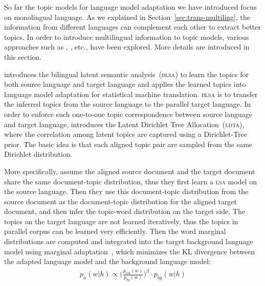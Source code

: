 So far the topic models for language model adaptation we have introduced focus on monolingual language. As we explained in Section~\ref{sec:trans-multiling}, the information from different languages can complement each other to extract better topics. In order to introduce multilingual information to topic models, various approaches such as \cite{Tam-2007}, \cite{Ruiz-2011}, \cite{Yu-2013} etc., have been explored. More details are introduced in this section.

\cite{Tam-2007} introduces the bilingual latent semantic analysis~(\textsc{blsa}) to learn the topics for both source language and target language and applies the learned topics into language model adaptation for statistical machine translation. \textsc{blsa} is to transfer the inferred topics from the source language to the parallel target language. In order to enforce such one-to-one topic correspondence between source language and target language, \cite{Tam-2007} introduces the Latent Dirichlet Tree Allocation~(\textsc{ldta}), where the correlation among latent topics are captured using a Dirichlet-Tree prior. The basic idea is that each aligned topic pair are sampled from the same Dirichlet distribution.

More specifically, \cite{Tam-2007} assume the aligned source document and the target document share the same document-topic distribution, thus they first learn a \textsc{lsa} model on the source language. Then they use this document-topic distribution from the source document as the document-topic distribution for the aligned target document, and then infer the topic-word distribution on the target side. The topics on the target language are not learned iteratively, thus the topics in parallel corpus can be learned very efficiently. Then the word marginal distributions are computed and integrated into the target background language model using marginal adaptation~\citep{Kneser-1997b}, which minimizes the KL divergence between the adapted language model and the background language model:
\begin{align}
\label{eq:mdi}
p_a(w|h) \propto \Big( \frac{p_{lsa}(w)}{p_{bg}(w)} \Big) ^{\beta} \cdot p_{bg}(w|h)
\end{align}

